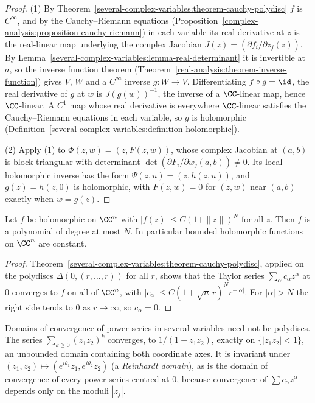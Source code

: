 \begin{proof}
(1) By Theorem~\ref{several-complex-variables:theorem-cauchy-polydisc} $f$ is $C^\infty$, and by the Cauchy--Riemann equations (Proposition~\ref{complex-analysis:proposition-cauchy-riemann}) in each variable its real
derivative at $z$ is the real-linear map underlying the complex Jacobian $J(z) = (\partial f_i/\partial z_j(z))$. By Lemma~\ref{several-complex-variables:lemma-real-determinant} it is invertible at $a$, so the inverse function
theorem (Theorem~\ref{real-analysis:theorem-inverse-function}) gives $V$, $W$ and a $C^\infty$ inverse $g \colon W \to V$. Differentiating $f \circ g = \id$, the real derivative of $g$ at $w$ is $J(g(w))^{-1}$, the inverse of a
$\CC$-linear map, hence $\CC$-linear. A $C^1$ map whose real derivative is everywhere $\CC$-linear satisfies the Cauchy--Riemann equations in each variable, so $g$ is holomorphic
(Definition~\ref{several-complex-variables:definition-holomorphic}).

(2) Apply (1) to $\Phi(z, w) = (z, F(z, w))$, whose complex Jacobian at $(a, b)$ is block triangular with determinant $\det(\partial F_i/\partial w_j(a, b)) \neq 0$. Its local holomorphic inverse has the form
$\Psi(z, u) = (z, h(z, u))$, and $g(z) = h(z, 0)$ is holomorphic, with $F(z, w) = 0$ for $(z, w)$ near $(a, b)$ exactly when $w = g(z)$.
\end{proof}

\begin{corollary}[Liouville]\label{several-complex-variables:corollary-liouville}
Let $f$ be holomorphic on $\CC^n$ with $|f(z)| \leq C(1 + \|z\|)^N$ for all $z$. Then $f$ is a polynomial of degree at most $N$. In particular bounded holomorphic functions on $\CC^n$ are constant.
\end{corollary}

\begin{proof}
Theorem~\ref{several-complex-variables:theorem-cauchy-polydisc}, applied on the polydiscs $\Delta(0, (r, \ldots, r))$ for all $r$, shows that the Taylor series $\sum_\alpha c_\alpha z^\alpha$ at $0$ converges to $f$ on
all of $\CC^n$, with $|c_\alpha| \leq C(1 + \sqrt{n}\,r)^Nr^{-|\alpha|}$. For $|\alpha| > N$ the right side tends to $0$ as $r \to \infty$, so $c_\alpha = 0$.
\end{proof}

\begin{example}\label{several-complex-variables:example-reinhardt}
Domains of convergence of power series in several variables need not be polydiscs. The series $\sum_{k \geq 0}(z_1z_2)^k$ converges, to $1/(1 - z_1z_2)$, exactly on $\{|z_1z_2| < 1\}$, an unbounded domain containing both
coordinate axes. It is invariant under $(z_1, z_2) \mapsto (e^{i\theta_1}z_1, e^{i\theta_2}z_2)$ (a \emph{Reinhardt domain}), as is the domain of convergence of every power series centred at $0$, because convergence of
$\sum c_\alpha z^\alpha$ depends only on the moduli $|z_j|$.
\end{example}

